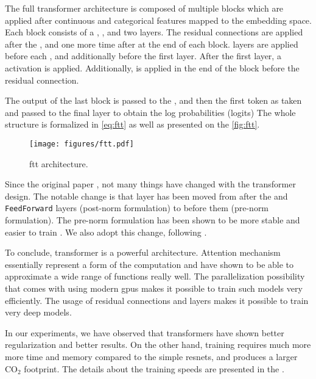 The full transformer architecture is composed of multiple blocks which are applied after continuous and categorical
features mapped to the embedding space. Each block consists of a \LayerNorm, \MHA, and two \Linear
layers. The residual connections are applied after the \MHA, and one more time after at the end of each block.
\LayerNorm layers are applied before each \MHA, and additionally before the first \Linear layer. After the first \Linear
layer, a \GELU activation is applied. Additionally, \Dropout is applied in the end of the block before the residual
connection.

The output of the last block is passed to the \LayerNorm, and then the first token as taken and passed to the
final \Linear layer to obtain the log probabilities (logits) The whole structure is formalized in
\autoref{eq:ftt} as well as presented on the \autoref{fig:ftt}.


\begin{figure}[htb]
    \centering
    \texttt{[image: figures/ftt.pdf]} \caption{\gls{ftt} architecture.}
    \label{fig:ftt}
\end{figure}


Since the original paper \cite{transformer}, not many things have changed with the transformer design. The notable
change is that \LayerNorm layer has been moved from after the \MHA and \texttt{FeedForward} layers
(post-norm formulation) to before them (pre-norm formulation). The pre-norm formulation has been shown to be more stable
and easier to train \cite{pre-norm}. We also adopt this change, following \cite{ft-transformer}.

To conclude, transformer is a powerful architecture. Attention mechanism essentially represent a form of the
computation and have shown to be able to approximate a wide range of functions really well. The parallelization
possibility that comes with using modern \gls{gpu}s makes it possible to train such models very efficiently. The usage
of residual connections and \LayerNorm layers makes it possible to train very deep models.

In our experiments, we have observed that transformers have shown better regularization and better results. On the other
hand, training requires much more more time and memory compared to the simple \glspl{resnet}, and produces a larger
$\text{CO}_2$ footprint. The details about the training speeds are presented in the .

